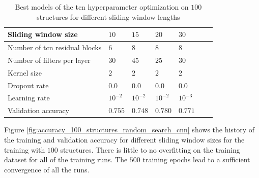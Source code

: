 \documentclass[conference]{IEEEtran}
\begin{document}
\begin{table}[htp]
	\centering
	\caption{Best models of the \gls{tcn} hyperparameter optimization on $ 100 $ structures for different sliding window lengths}
	\label{tab:hyperparameters_100_structures_tcn}
	\begin{tabular}{p{2.5cm}|llllll}
		Sliding window size & $ 10 $ & $ 15 $ & $ 20 $ & $ 30 $ \\
		\hline
		Number of \gls{tcn} residual blocks & $ 6 $ & $ 8 $ & $ 8 $ & $ 8 $ \\
		Number of filters per layer & $ 30 $ & $ 45 $ & $ 25 $ & $ 30 $ \\
		Kernel size & $ 2 $ & $ 2 $ & $ 2 $ & $ 2 $ \\
		Dropout rate & $ 0.0 $ & $ 0.0 $ & $ 0.0 $ & $ 0.0 $ \\
		Learning rate & $ 10^{-2} $ & $ 10^{-2} $ & $ 10^{-2} $ & $ 10^{-3} $ \\
		\hline
		Validation accuracy & $ 0.755 $ & $ 0.748 $ & $ 0.780 $ & $ 0.771 $
	\end{tabular}
\end{table}

Figure \ref{fig:accuracy_100_structures_random_search_cnn} shows the history of the training and validation accuracy for different sliding window sizes for the training with $ 100 $ structures. There is little to no overfitting on the training dataset for all of the training runs. The $ 500 $ training epochs lead to a sufficient convergence of all the runs.
\end{document}
